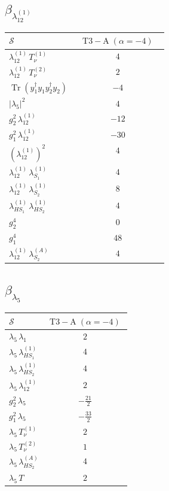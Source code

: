 \documentclass[9pt]{article}
\begin{document}
\subsection*{$ \beta_{\lambda_{12}^{(1)}} $}
\begin{longtable}{@{}p{0.31\linewidth}c@{}}
\toprule
$\mathcal{S}$ & $ \mathrm{T3-A}\;(\alpha=-4) $ \\
\midrule
$ \lambda_{12}^{(1)}\,T_{\nu}^{(1)} $ & $ 4 $ \\
$ \lambda_{12}^{(1)}\,T_{\nu}^{(2)} $ & $ 2 $ \\
$ \operatorname{Tr}(y_1^\dagger y_1y_2^\dagger y_2) $ & $ -4 $ \\
$ |\lambda_5|^2 $ & $ 4 $ \\
$ g_2^2\,\lambda_{12}^{(1)} $ & $ -12 $ \\
$ g_1^2\,\lambda_{12}^{(1)} $ & $ -30 $ \\
$ \left(\lambda_{12}^{(1)}\right)^2 $ & $ 4 $ \\
$ \lambda_{12}^{(1)}\,\lambda_{S_1}^{(1)} $ & $ 4 $ \\
$ \lambda_{12}^{(1)}\,\lambda_{S_2}^{(1)} $ & $ 8 $ \\
$ \lambda_{HS_1}^{(1)}\,\lambda_{HS_2}^{(1)} $ & $ 4 $ \\
$ g_2^4 $ & $ 0 $ \\
$ g_1^4 $ & $ 48 $ \\
$ \lambda_{12}^{(1)}\,\lambda_{S_2}^{(A)} $ & $ 4 $ \\
\bottomrule
\end{longtable}
\subsection*{$ \beta_{\lambda_5} $}
\begin{longtable}{@{}p{0.31\linewidth}c@{}}
\toprule
$\mathcal{S}$ & $ \mathrm{T3-A}\;(\alpha=-4) $ \\
\midrule
$ \lambda_5\,\lambda_1 $ & $ 2 $ \\
$ \lambda_5\,\lambda_{HS_1}^{(1)} $ & $ 4 $ \\
$ \lambda_5\,\lambda_{HS_2}^{(1)} $ & $ 4 $ \\
$ \lambda_5\,\lambda_{12}^{(1)} $ & $ 2 $ \\
$ g_2^2\,\lambda_5 $ & $ - \frac{21}{2} $ \\
$ g_1^2\,\lambda_5 $ & $ - \frac{33}{2} $ \\
$ \lambda_5\,T_{\nu}^{(1)} $ & $ 2 $ \\
$ \lambda_5\,T_{\nu}^{(2)} $ & $ 1 $ \\
$ \lambda_5\,\lambda_{HS_2}^{(A)} $ & $ 4 $ \\
$ \lambda_5\,T $ & $ 2 $ \\
\bottomrule
\end{longtable}
\end{document}
